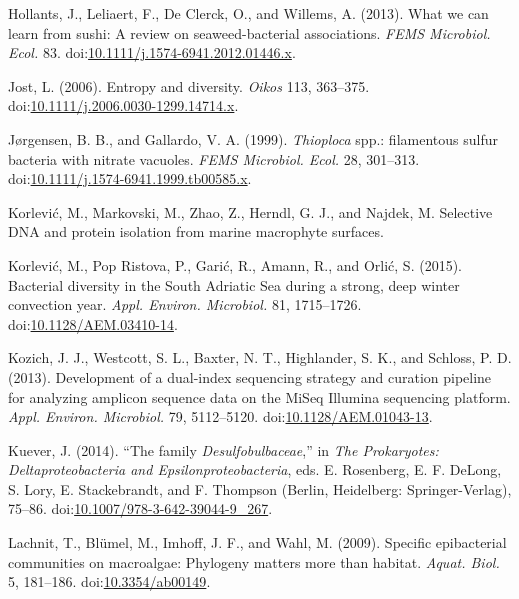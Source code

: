 \documentclass[
  12pt,
]{article}
\begin{document}
\leavevmode\hypertarget{ref-Hollants2013}{}%
Hollants, J., Leliaert, F., De Clerck, O., and Willems, A. (2013). What
we can learn from sushi: A review on seaweed-bacterial associations.
\emph{FEMS Microbiol. Ecol.} 83.
doi:\href{https://doi.org/10.1111/j.1574-6941.2012.01446.x}{10.1111/j.1574-6941.2012.01446.x}.

\leavevmode\hypertarget{ref-Jost2006}{}%
Jost, L. (2006). Entropy and diversity. \emph{Oikos} 113, 363--375.
doi:\href{https://doi.org/10.1111/j.2006.0030-1299.14714.x}{10.1111/j.2006.0030-1299.14714.x}.

\leavevmode\hypertarget{ref-Jorgensen1999}{}%
Jørgensen, B. B., and Gallardo, V. A. (1999). \emph{Thioploca} spp.:
filamentous sulfur bacteria with nitrate vacuoles. \emph{FEMS Microbiol.
Ecol.} 28, 301--313.
doi:\href{https://doi.org/10.1111/j.1574-6941.1999.tb00585.x}{10.1111/j.1574-6941.1999.tb00585.x}.

\leavevmode\hypertarget{ref-Korlevic}{}%
Korlević, M., Markovski, M., Zhao, Z., Herndl, G. J., and Najdek, M.
Selective DNA and protein isolation from marine macrophyte surfaces.

\leavevmode\hypertarget{ref-Korlevic2015}{}%
Korlević, M., Pop Ristova, P., Garić, R., Amann, R., and Orlić, S.
(2015). Bacterial diversity in the South Adriatic Sea during a strong,
deep winter convection year. \emph{Appl. Environ. Microbiol.} 81,
1715--1726.
doi:\href{https://doi.org/10.1128/AEM.03410-14}{10.1128/AEM.03410-14}.

\leavevmode\hypertarget{ref-Kozich2013}{}%
Kozich, J. J., Westcott, S. L., Baxter, N. T., Highlander, S. K., and
Schloss, P. D. (2013). Development of a dual-index sequencing strategy
and curation pipeline for analyzing amplicon sequence data on the MiSeq
Illumina sequencing platform. \emph{Appl. Environ. Microbiol.} 79,
5112--5120.
doi:\href{https://doi.org/10.1128/AEM.01043-13}{10.1128/AEM.01043-13}.

\leavevmode\hypertarget{ref-Kuever2014}{}%
Kuever, J. (2014). ``The family \emph{Desulfobulbaceae},'' in \emph{The
Prokaryotes: Deltaproteobacteria and Epsilonproteobacteria}, eds. E.
Rosenberg, E. F. DeLong, S. Lory, E. Stackebrandt, and F. Thompson
(Berlin, Heidelberg: Springer-Verlag), 75--86.
doi:\href{https://doi.org/10.1007/978-3-642-39044-9_267}{10.1007/978-3-642-39044-9\_267}.

\leavevmode\hypertarget{ref-Lachnit2009}{}%
Lachnit, T., Blümel, M., Imhoff, J. F., and Wahl, M. (2009). Specific
epibacterial communities on macroalgae: Phylogeny matters more than
habitat. \emph{Aquat. Biol.} 5, 181--186.
doi:\href{https://doi.org/10.3354/ab00149}{10.3354/ab00149}.
\end{document}
